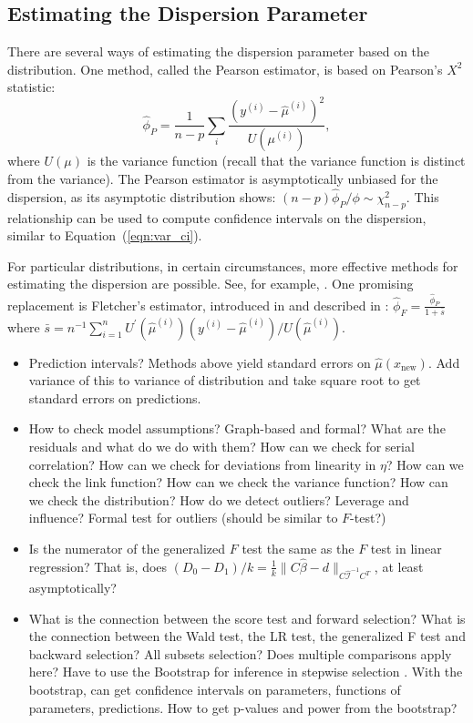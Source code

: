 \documentclass[12pt]{article}
\begin{document}
\subsection{Estimating the Dispersion Parameter}
There are several ways of estimating the dispersion parameter based on the distribution. One method, called the Pearson estimator, is based on Pearson's $X^2$ statistic:
\begin{displaymath}
   \hat{\phi}_P = \frac{1}{n-p} \sum_i \frac{(y^{(i)} - \hat{\mu}^{(i)})^2}{U(\mu^{(i)})},
\end{displaymath}
where $U(\mu)$ is the variance function (recall that the variance function is distinct from the variance). The Pearson estimator is asymptotically unbiased for the dispersion, as its asymptotic distribution shows: $(n-p)\hat{\phi}_P / \phi \sim \chi_{n-p}^2$. This relationship can be used to compute confidence intervals on the dispersion, similar to Equation~(\ref{eqn:var_ci}).

For particular distributions, in certain circumstances, more effective methods for estimating the dispersion are possible. See, for example, \cite[\S 4.5.2, \S 6.2.4, and \S 8.3.6]{MN:1983}. One promising replacement is Fletcher's estimator, introduced in \cite{Fletcher:12} and described in \cite[\S 3.1.5]{Wood:2017}: $\hat{\phi}_F = \frac{\hat{\phi}_P}{1 + \bar{s}}$ where $\bar{s}=n^{-1} \sum_{i=1}^n U^\prime(\hat{\mu}^{(i)}) (y^{(i)} - \hat{\mu}^{(i)})/U(\hat{\mu}^{(i)})$.

\begin{itemize}
\item Prediction intervals? Methods above yield standard errors on $\hat{\mu}(x_\textrm{new})$. Add variance of this to variance of distribution and take square root to get standard errors on predictions.
\item How to check model assumptions? Graph-based and formal? What are the residuals and what do we do with them? How can we check for serial correlation? How can we check for deviations from linearity in $\eta$? How can we check the link function? How can we check the variance function? How can we check the distribution? How do we detect outliers? Leverage and influence? Formal test for outliers (should be similar to $F$-test?)
\item Is the numerator of the generalized $F$ test the same as the $F$ test in linear regression? That is, does $(D_0 - D_1) / k = \frac{1}{k} \| C \hat{\beta} - d \|_{C \hat{\mathcal{I}}^{-1} C^T}$, at least asymptotically?
\item What is the connection between the score test and forward selection? What is the connection between the Wald test, the LR test, the generalized F test and backward selection? All subsets selection? Does multiple comparisons apply here? Have to use the Bootstrap for inference in stepwise selection \cite[\S~3.3.2]{Hastie:2001}. With the bootstrap, can get confidence intervals on parameters, functions of parameters, predictions. How to get p-values and power from the bootstrap?
\end{itemize}
\end{document}
